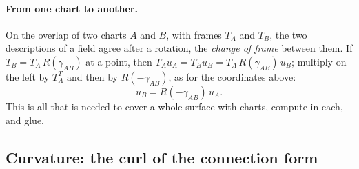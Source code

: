 \paragraph{From one chart to another.} On the overlap of two charts $A$ and $B$, with frames $T_A$ and $T_B$, the two descriptions of a field agree after a rotation, the \emph{change of frame} between them. If $T_B = T_A\, R(\gamma_{AB})$ at a point, then $T_Au_A = T_Bu_B = T_A\, R(\gamma_{AB})\,u_B$; multiply on the left by $T_A^T$ and then by $R(-\gamma_{AB})$, as for the coordinates above:
\begin{equation}
\label{eqn:r3_transition}
u_B = R(-\gamma_{AB})\, u_A .
\end{equation}
This is all that is needed to cover a whole surface with charts, compute in each, and glue.

\subsection{Curvature: the curl of the connection form}
\label{section:r3_curvature}

